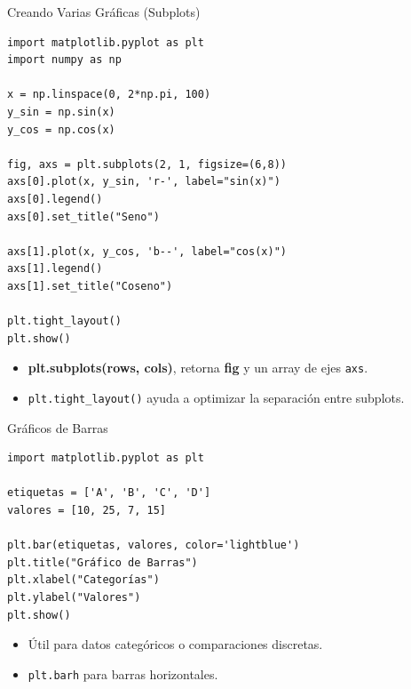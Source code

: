 \documentclass[10pt]{beamer}
\begin{document}
\begin{frame}[fragile]{Creando Varias Gráficas (Subplots)}
\begin{verbatim}
import matplotlib.pyplot as plt
import numpy as np

x = np.linspace(0, 2*np.pi, 100)
y_sin = np.sin(x)
y_cos = np.cos(x)

fig, axs = plt.subplots(2, 1, figsize=(6,8))
axs[0].plot(x, y_sin, 'r-', label="sin(x)")
axs[0].legend()
axs[0].set_title("Seno")

axs[1].plot(x, y_cos, 'b--', label="cos(x)")
axs[1].legend()
axs[1].set_title("Coseno")

plt.tight_layout()
plt.show()
\end{verbatim}
\begin{itemize}
  \item \textbf{plt.subplots(rows, cols)}, retorna \textbf{fig} y un array de ejes \texttt{axs}.
  \item \texttt{plt.tight\_layout()} ayuda a optimizar la separación entre subplots.
\end{itemize}
\end{frame}

\begin{frame}[fragile]{Gráficos de Barras}
\begin{verbatim}
import matplotlib.pyplot as plt

etiquetas = ['A', 'B', 'C', 'D']
valores = [10, 25, 7, 15]

plt.bar(etiquetas, valores, color='lightblue')
plt.title("Gráfico de Barras")
plt.xlabel("Categorías")
plt.ylabel("Valores")
plt.show()
\end{verbatim}
\begin{itemize}
  \item Útil para datos categóricos o comparaciones discretas.
  \item \texttt{plt.barh} para barras horizontales.
\end{itemize}
\end{frame}
\end{document}

